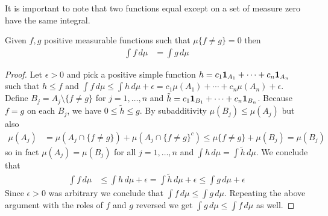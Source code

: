 It is important to note that two functions equal except on a set of measure zero have the same integral.
\begin{prop}\label{AlmostEverywhereEqualIntegralEqual}Given $f,g$ positive measurable functions such that $\mu \lbrace f \neq g \rbrace = 0$ then
\begin{align*}
\int f \, d\mu &= \int g \, d\mu
\end{align*}
\end{prop}
\begin{proof}
Let $\epsilon > 0$ and pick a positive simple function $h = c_1 \textbf{1}_{A_1} + \dotsb + c_n \textbf{1}_{A_n}$ 
such that $h \leq f$ and $\int f \, d\mu \leq \int h \, d\mu + \epsilon = c_1 \mu(A_1) + \dotsb + c_n \mu(A_n) + \epsilon$.  Define $B_j = A_j \setminus \lbrace f \neq g \rbrace$ for $j = 1, \dotsc, n$ and $\tilde{h} = c_1 \textbf{1}_{B_1} + \dotsb + c_n \textbf{1}_{B_n}$.  Because $f=g$ on each $B_j$, we have $0 \leq \tilde{h} \leq g$.  By subadditivity $\mu(B_j) \leq \mu(A_j)$ but also 
\begin{align*}
\mu(A_j) &= \mu(A_j \cap \lbrace f \neq g \rbrace)  + \mu(A_j \cap \lbrace f \neq g \rbrace^c) \leq  \mu\lbrace f \neq g \rbrace + \mu(B_j) = \mu(B_j)
\end{align*}
so in fact $\mu(A_j) = \mu(B_j)$ for all $j=1, \dotsc, n$ and $\int h \, d\mu = \int \tilde{h} \, d\mu$.   We conclude that 
\begin{align*}
\int f \, d\mu &\leq \int h \, d\mu + \epsilon = \int \tilde{h} \, d\mu + \epsilon \leq \int g \, d\mu + \epsilon
\end{align*}
Since $\epsilon>0$ was arbitrary we conclude that $\int f \, d\mu \leq \int g \, d\mu$.  Repeating the above argument with the roles of $f$ and $g$ reversed we get 
$\int g \, d\mu \leq \int f \, d\mu$ as well.
\end{proof}

